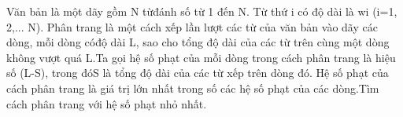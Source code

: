 Văn bản là một dãy gồm N từđánh số từ 1 đến N. Từ thứ i có độ dài là wi (i=1, 2,... N). Phân trang là một cách xếp lần lượt các từ của văn bản vào dãy các dòng, mỗi dòng cóđộ dài L, sao cho tổng độ dài của các từ trên cùng một dòng không vượt quá L.Ta gọi hệ số phạt của mỗi dòng trong cách phân trang là hiệu số (L-S), trong đóS là tổng độ dài của các từ xếp trên dòng đó. Hệ số phạt của cách phân trang là giá trị lớn nhất trong số các hệ số phạt của các dòng.Tìm cách phân trang với hệ số phạt nhỏ nhất.  

\